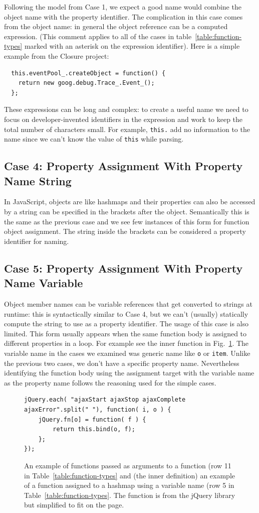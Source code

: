 \documentclass[10pt, preprint]{sigplanconf}
\begin{document}
Following the model from Case 1, we expect a good name would combine the object name with the property identifier. The complication in this case comes from the object name: in general the object reference can be a computed expression. (This comment applies to all of the cases in table~\ref{table:function-types} marked with an asterisk on the expression identifier). Here is a simple example from the Closure project: 
\begin{verbatim}
  this.eventPool_.createObject = function() {
    return new goog.debug.Trace_.Event_();
  };
\end{verbatim}
 These expressions can be long and complex: to create a useful name we need to focus on developer-invented identifiers in the expression and work to keep the total number of characters small. For example, \verb|this.| add no information to the name since we can't know the value of \verb|this| while parsing. 

\subsection{Case 4: Property Assignment With  Property Name String}
In JavaScript, objects are like hashmaps and their properties can also be accessed by a string can be specified in the brackets after the object. Semantically this is the same as the previous case and we see few instances of this form for function object assignment. The string inside the brackets can be considered a property identifier for naming.

\subsection{Case 5: Property Assignment With  Property Name Variable}
Object member names can be variable references that get converted to strings at runtime: this is syntactically similar to Case 4, but we can't (usually) statically compute the string to use as a property identifier.
The usage of this case is also limited. This form usually appears when the same function body is assigned to different properties in a loop. 
For example see the inner function in Fig.~\ref{fig:jQueryEach}. The variable
 name in the cases we examined was generic name like {\small\texttt{o}} or {\small\texttt{item}}. Unlike the previous two cases, we
don't have a specific property name.  Nevertheless identifying the function body using the assignment target with the variable name as the property name follows the reasoning used for the simple cases.
\begin{figure}[htp]
\begin{verbatim}
jQuery.each( "ajaxStart ajaxStop ajaxComplete ajaxError".split(" "), function( i, o ) {
    jQuery.fn[o] = function( f ) {
        return this.bind(o, f);
    };
});
\end{verbatim}
\caption{An example of functions passed as arguments to a function (row 11 in Table~\ref{table:function-types} and (the inner definition) an example of a 
function assigned to a hashmap using a variable name (row 5 in Table~\ref{table:function-types}. The function is from the jQuery library but simplified to fit on the page. }
\label{fig:jQueryEach}
\end{figure}
\end{document}
